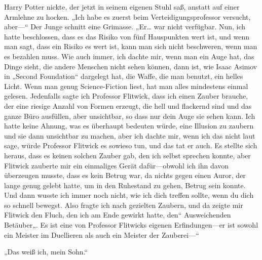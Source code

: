 Harry Potter nickte, der jetzt in seinem eigenen Stuhl saß, anstatt auf einer Armlehne zu hocken. „Ich habe es zuerst beim Verteidigungsprofessor versucht, aber—“ Der Junge schnitt eine Grimasse. „Er… war nicht verfügbar. Nun, ich hatte beschlossen, dass es das Risiko von fünf Hauspunkten wert ist, und wenn man sagt, dass ein Risiko es wert ist, kann man sich nicht beschweren, wenn man es bezahlen muss. Wie auch immer, ich dachte mir, wenn man ein Auge hat, das Dinge sieht, die andere Menschen nicht sehen können, dann ist, wie Isaac Asimov in „Second Foundation“ dargelegt hat, die Waffe, die man benutzt, ein helles Licht. Wenn man genug Science-Fiction liest, hat man alles mindestens einmal gelesen. Jedenfalls sagte ich Professor Flitwick, dass ich einen Zauber brauche, der eine riesige Anzahl von Formen erzeugt, die hell und flackernd sind und das ganze Büro ausfüllen, aber unsichtbar, so dass nur dein Auge sie sehen kann. Ich hatte keine Ahnung, was es überhaupt bedeuten würde, eine Illusion zu zaubern und sie dann unsichtbar zu machen, aber ich dachte mir, wenn ich das nicht laut sage, würde Professor Flitwick es sowieso tun, und das tat er auch. Es stellte sich heraus, dass es keinen solchen Zauber gab, den ich selbst sprechen konnte, aber Flitwick zauberte mir ein einmaliges Gerät dafür—obwohl ich ihn davon überzeugen musste, dass es kein Betrug war, da nichts gegen einen Auror, der lange genug gelebt hatte, um in den Ruhestand zu gehen, Betrug sein konnte. Und dann wusste ich immer noch nicht, wie ich dich treffen sollte, wenn du dich so schnell bewegst. Also fragte ich nach gezielten Zaubern, und da zeigte mir Flitwick den Fluch, den ich am Ende gewirkt hatte, den“ Ausweichenden Betäuber„. Es ist eine von Professor Flitwicks eigenen Erfindungen—er ist sowohl ein Meister im Duellieren als auch ein Meister der Zauberei—“

„Das weiß ich, mein Sohn.“

